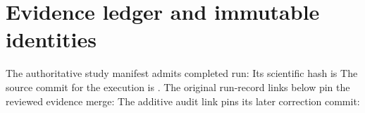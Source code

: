 \section{Evidence ledger and immutable identities}
\label{app:evidence}

The authoritative study manifest admits \StudyCompleted{} completed run:
Its scientific hash is
The source commit for the execution is
. The original run-record links
below pin the reviewed evidence merge:
The additive audit link pins its later correction commit:

